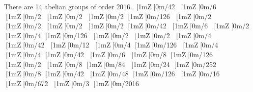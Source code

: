 There are 14 abelian groups of order 2016.
[1mZ[0m/42⊕ [1mZ[0m/6⊕ [1mZ[0m/2⊕ [1mZ[0m/2⊕ [1mZ[0m/2
[1mZ[0m/126⊕ [1mZ[0m/2⊕ [1mZ[0m/2⊕ [1mZ[0m/2⊕ [1mZ[0m/2
[1mZ[0m/42⊕ [1mZ[0m/6⊕ [1mZ[0m/2⊕ [1mZ[0m/4
[1mZ[0m/126⊕ [1mZ[0m/2⊕ [1mZ[0m/2⊕ [1mZ[0m/4
[1mZ[0m/42⊕ [1mZ[0m/12⊕ [1mZ[0m/4
[1mZ[0m/126⊕ [1mZ[0m/4⊕ [1mZ[0m/4
[1mZ[0m/42⊕ [1mZ[0m/6⊕ [1mZ[0m/8
[1mZ[0m/126⊕ [1mZ[0m/2⊕ [1mZ[0m/8
[1mZ[0m/84⊕ [1mZ[0m/24
[1mZ[0m/252⊕ [1mZ[0m/8
[1mZ[0m/42⊕ [1mZ[0m/48
[1mZ[0m/126⊕ [1mZ[0m/16
[1mZ[0m/672⊕ [1mZ[0m/3
[1mZ[0m/2016
